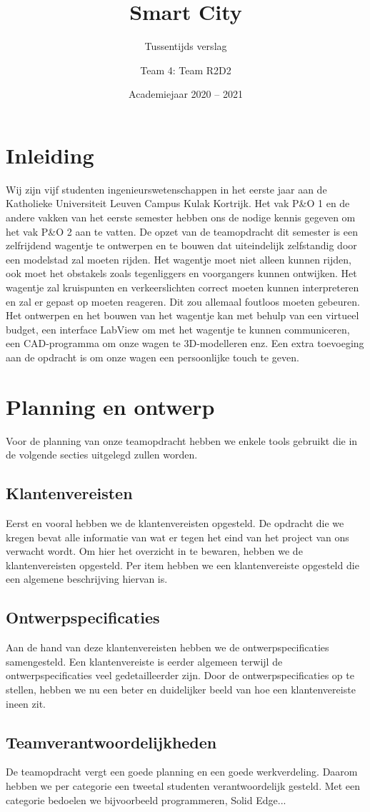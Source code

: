 \documentclass[a4paper,twoside,kulak]{kulakreport}
\title{Smart City}
\subtitle{Tussentijds verslag}
\author{Team 4: Team R2D2}
\institute{Matthijs Deforche, Karl Van Holder, Thomas Varheust, Kobe De Weerdt, Yaron Verhulst}
\date{Academiejaar 2020 -- 2021}
\begin{document}
	\titlepage
	\chapter*{Inleiding}
	Wij zijn vijf studenten ingenieurswetenschappen in het eerste jaar aan de Katholieke Universiteit Leuven Campus Kulak Kortrijk.
	Het vak P\&O 1 en de andere vakken van het eerste semester hebben ons de nodige kennis gegeven om het vak P\&O 2 aan te vatten. 
	De opzet van de teamopdracht dit semester is een zelfrijdend wagentje te ontwerpen en te bouwen dat uiteindelijk zelfstandig door een modelstad zal moeten rijden. Het wagentje moet niet alleen kunnen rijden, ook moet het obstakels zoals tegenliggers en voorgangers kunnen ontwijken. Het wagentje zal kruispunten en verkeerslichten correct moeten kunnen interpreteren en zal er gepast op moeten reageren. Dit zou allemaal foutloos moeten gebeuren. Het ontwerpen en het bouwen van het wagentje kan met behulp van een virtueel budget, een interface LabView om met het wagentje te kunnen communiceren, een CAD-programma om onze wagen te 3D-modelleren enz. 
	Een extra toevoeging aan de opdracht is om onze wagen een persoonlijke touch te geven. 
	
	
	\chapter*{Planning en ontwerp}
	Voor de planning van onze teamopdracht hebben we enkele tools gebruikt die in de volgende secties uitgelegd zullen worden. 
	\section*{Klantenvereisten}
	Eerst en vooral hebben we de klantenvereisten opgesteld. De opdracht die we kregen bevat alle informatie van wat er tegen het eind van het project van ons verwacht wordt. Om hier het overzicht in te bewaren, hebben we de klantenvereisten opgesteld. Per item hebben we een klantenvereiste opgesteld die een algemene beschrijving hiervan is. 
	\section*{Ontwerpspecificaties}Aan de hand van deze klantenvereisten hebben we de ontwerpspecificaties samengesteld. Een klantenvereiste is eerder algemeen terwijl de ontwerpspecificaties veel gedetailleerder zijn. Door de ontwerpspecificaties op te stellen, hebben we nu een beter en duidelijker beeld van hoe een klantenvereiste ineen zit. 
	\section*{Teamverantwoordelijkheden}De teamopdracht vergt een goede planning en een goede werkverdeling. Daarom hebben we per categorie een tweetal studenten verantwoordelijk gesteld. Met een categorie bedoelen we bijvoorbeeld programmeren, Solid Edge...
\end{document}
